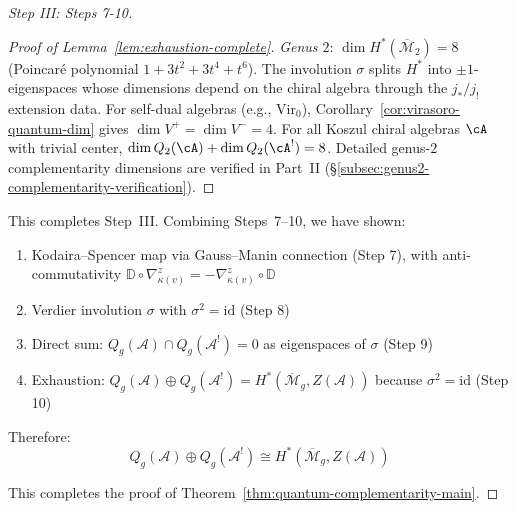 \begin{proof}[Step III: Steps 7-10]
\begin{proof}[Proof of Lemma~\ref{lem:exhaustion-complete}]
\emph{Genus $2$}: $\dim H^*(\overline{\mathcal{M}}_2) = 8$
(Poincar\'e polynomial $1 + 3t^2 + 3t^4 + t^6$).
The involution $\sigma$ splits $H^*$ into $\pm 1$-eigenspaces whose
dimensions depend on the chiral algebra through the $j_*/j_!$ extension
data.  For self-dual algebras (e.g., $\mathrm{Vir}_0$),
Corollary~\ref{cor:virasoro-quantum-dim} gives
$\dim V^+ = \dim V^- = 4$.  For all Koszul chiral algebras
$\cA$ with trivial center, $\dim Q_2(\cA) + \dim Q_2(\cA^!) = 8$.
Detailed genus-$2$ complementarity dimensions are verified in
Part~II (\S\ref{subsec:genus2-complementarity-verification}).
\end{proof}

This completes Step~III. Combining Steps~7--10, we have shown:
\begin{enumerate}
\item Kodaira--Spencer map via Gauss--Manin connection (Step 7), with anti-commutativity
$\mathbb{D} \circ \nabla_{\kappa(v)}^z = -\nabla_{\kappa(v)}^z \circ \mathbb{D}$
\item Verdier involution $\sigma$ with $\sigma^2 = \mathrm{id}$ (Step 8)
\item Direct sum: $Q_g(\mathcal{A}) \cap Q_g(\mathcal{A}^!) = 0$ as eigenspaces of
$\sigma$ (Step 9)
\item Exhaustion: $Q_g(\mathcal{A}) \oplus Q_g(\mathcal{A}^!) = H^*(\overline{
\mathcal{M}}_g, Z(\mathcal{A}))$ because $\sigma^2 = \mathrm{id}$ (Step 10)
\end{enumerate}

Therefore:
\begin{equation}
Q_g(\mathcal{A}) \oplus Q_g(\mathcal{A}^!) \cong H^*(\overline{\mathcal{M}}_g,
Z(\mathcal{A}))
\end{equation}

This completes the proof of Theorem~\ref{thm:quantum-complementarity-main}. \qedhere

\end{proof}

